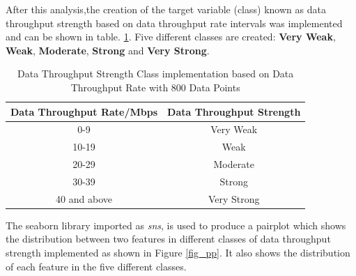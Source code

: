 After this analysis,the creation of the target variable (class) known as data throughput strength based on data throughput rate intervals was implemented and can be shown in table. \ref{table:class}. Five different classes are created: \textbf{Very Weak}, \textbf{Weak}, \textbf{Moderate}, \textbf{Strong} and \textbf{Very Strong}.

\begin{table}[ht]
\centering
\begin{center}
\begin{tabular}{ |c|c| } 
 \hline
 Data Throughput Rate/Mbps & Data Throughput Strength\\ 
  \hline\hline
 0-9 & Very Weak\\ 
 10-19 & Weak\\ 
 20-29 & Moderate \\ 
 30-39 & Strong\\ 
 40 and above & Very Strong\\ 

 \hline
\end{tabular}
\caption{Data Throughput Strength Class implementation based on Data Throughput Rate with 800 Data Points}
\label{table:class}
\end{center}
\end{table}

The seaborn library imported as \textit{sns}, is used to produce a pairplot which shows the distribution between two features in different classes of data throughput strength implemented as shown in Figure \ref{fig_pp}. It also shows the distribution of each feature in the five different classes.

